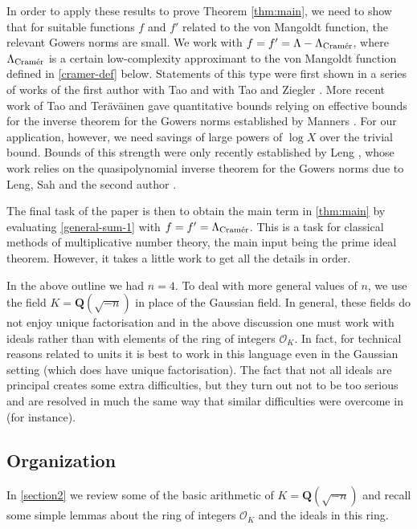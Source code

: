 \documentclass[11pt,reqno]{amsart}
\numberwithin{equation}{section}
\theoremstyle{definition}
\theoremstyle{remark}
\newcommand\Q{\mathbf{Q}}
\newcommand\cramer{{\textnormal{Cram\'er}}}
\renewcommand\O{\mathcal{O}}
\begin{document}
In order to apply these results to prove Theorem \ref{thm:main}, we need to show that for suitable functions $f$ and $f'$ related to the von Mangoldt function, the relevant Gowers norms are small. We work with $f = f' = \Lambda - \Lambda_{\cramer}$, where $\Lambda_{\cramer}$ is a certain low-complexity approximant to the von Mangoldt function defined in \cref{cramer-def} below. Statements of this type were first shown in a series of works of the first author with Tao \cite{green-tao-linear,GT12,GT12-orthog} and with Tao and Ziegler \cite{GTZ12}. More recent work of Tao and Ter\"av\"ainen \cite{TT21} gave quantitative bounds relying on effective bounds for the inverse theorem for the Gowers norms established by Manners \cite{Man18}. For our application, however, we need savings of large powers of $\log X$ over the trivial bound. Bounds of this strength were only recently established by Leng \cite{Len23b}, whose work relies on the quasipolynomial inverse theorem for the Gowers norms due to Leng, Sah and the second author \cite{LSS}. 

The final task of the paper is then to obtain the main term in \cref{thm:main} by evaluating \cref{general-sum-1} with $f = f' = \Lambda_{\cramer}$. This is a task for classical methods of multiplicative number theory, the main input being the prime ideal theorem. However, it takes a little work to get all the details in order.

In the above outline we had $n = 4$. To deal with more general values of $n$, we use the field $K = \Q(\sqrt{-n})$ in place of the Gaussian field. In general, these fields do not enjoy unique factorisation and in the above discussion one must work with ideals rather than with elements of the ring of integers $\O_K$. In fact, for technical reasons related to units it is best to work in this language even in the Gaussian setting (which does have unique factorisation). The fact that not all ideals are principal creates some extra difficulties, but they turn out not to be too serious and are resolved in much the same way that similar difficulties were overcome in \cite{hb-moroz,maynard-norm-forms} (for instance). 




\subsection{Organization}
In \cref{section2} we review some of the basic arithmetic of $K= \Q(\sqrt{-n})$ and recall some simple lemmas about the ring of integers $\O_K$ and the ideals in this ring.
\end{document}
